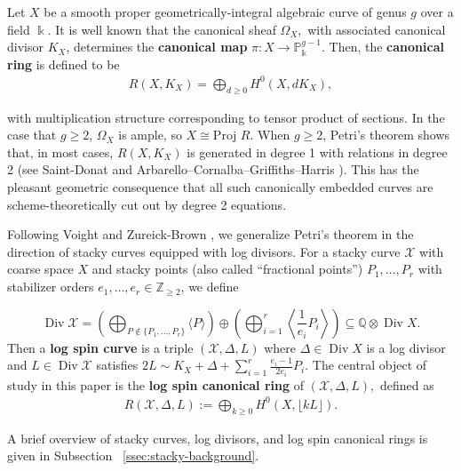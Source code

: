 \documentclass{amsart}
\theoremstyle{plain}
\theoremstyle{definition}
\theoremstyle{remark}
\numberwithin{equation}{section}
\newcommand\BQ{{\mathbb Q}}
\newcommand\BP{{\mathbb P}}
\newcommand\BZ{{\mathbb Z}}
\newcommand\Bk{{\Bbbk}}
\newcommand\proj{\text{Proj }}
\DeclareMathOperator\di{Div}
\newcommand\sx{\mathscr X}
\newcommand \subhalf[1]{\frac{{#1} - 1}{2{#1}}}
\newcommand{\halfcan}{L}
\begin{document}
Let $X$ be a smooth proper geometrically-integral algebraic curve of genus $g$ over a field $\Bk$.
It is well known that the canonical sheaf $\Omega _X,$ with
associated canonical divisor $K_X$, determines the {\bf canonical
map } $\pi: X \rightarrow \BP_\Bk^{g - 1}$. Then, the {\bf canonical
ring} is defined to be
\begin{align*}
	R(X, K_X) = \bigoplus_{d \geq 0} H^0(X, dK_X),
\end{align*}

\noindent
with multiplication structure corresponding to tensor product of
sections. In the case that $g \geq 2$, $\Omega_X$ is ample, so $X
\cong \proj R$. When $g \geq 2$, Petri's theorem 
shows that, in most cases, $R(X, K_X)$
is generated in degree 1 with relations in degree 2 (see
Saint-Donat \cite[p. 157]{saint-donat:proj} and Arbarello--Cornalba--Griffiths--Harris
\cite[Section 3.3]{acgh:algebraic-curves}). This has the pleasant 
geometric consequence that all such canonically embedded curves are
scheme-theoretically cut out by degree 2 equations.

Following Voight and Zureick-Brown \cite{vzb:stacky}, we generalize 
Petri's theorem in the direction of stacky curves equipped with
log divisors. For a stacky curve $\sx$ with coarse space $X$ and
stacky points (also called ``fractional points'') $P_1, \ldots, P_r$
with stabilizer orders $e_1, \ldots, e_r \in \BZ_{\geq 2}$, we define

\[
	\di \sx = \left(\bigoplus_{P\notin \{P_1, \ldots, P_r\}} \langle 
	P \rangle \right) \oplus \left(\bigoplus_{i = 1}^r \left \langle 
	\frac{1}{e_i}P_i \right \rangle \right) \subseteq \BQ \otimes \di X.
\]
Then a {\bf log spin curve} is a triple $(\sx, \Delta, \halfcan)$
where $\Delta \in \di X$ is a log divisor and $L \in \di \sx$ satisfies $2\halfcan \sim K_X +
\Delta + \sum_{i = 1}^{r} \subhalf{e_i} P_i$. The central object of
study in this paper is the {\bf log spin canonical ring} of $(\sx,
\Delta, \halfcan),$ defined as
\begin{align*}
	R(\sx, \Delta, \halfcan) := \bigoplus_{k \geq 0} H^0(X, \lfloor k \halfcan \rfloor).
\end{align*}

\noindent
A brief overview of stacky curves, log divisors, and log spin
canonical rings is given in Subsection
~\ref{ssec:stacky-background}.

\end{document}
